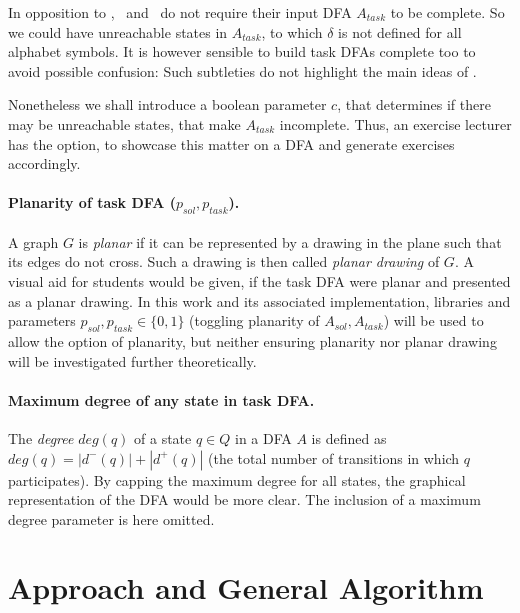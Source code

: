 In opposition to \CompDist, \CompUnr\ and \RemUnr\ do not require their input DFA $A_{task}$ to be complete. So we could have unreachable states in $A_{task}$, to which $\delta$ is not defined for all alphabet symbols. It is however sensible to build task DFAs complete too to avoid possible confusion: Such subtleties do not highlight the main ideas of \MinAlg.

Nonetheless we shall introduce a boolean parameter $c$, that determines if there may be unreachable states, that make $A_{task}$ incomplete. Thus, an exercise lecturer has the option, to showcase this matter on a DFA and generate exercises accordingly.

\paragraph*{Planarity of task DFA \texorpdfstring{($p_{sol}, p_{task}$)}{}.}

A graph $G$ is \emph{planar} if it can be represented by a drawing in the plane such that its edges do not cross. Such a drawing is then called \emph{planar drawing} of $G$. A visual aid for students would be given, if the task DFA were planar and presented as a planar drawing. In this work and its associated implementation, libraries and parameters $p_{sol}, p_{task} \in \{0,1\}$ (toggling planarity of $A_{sol}, A_{task}$) will be used to allow the option of planarity, but neither ensuring planarity nor planar drawing will be investigated further theoretically.

\paragraph*{Maximum degree of any state in task DFA.}

The \emph{degree} $deg(q)$ of a state $q \in Q$ in a DFA $A$ is defined as $deg(q) = |d^-(q)| + |d^+(q)|$ (the total number of transitions in which $q$ participates). By capping the maximum degree for all states, the graphical representation of the DFA would be more clear. The inclusion of a maximum degree parameter is here omitted.


\section{Approach and General Algorithm}

